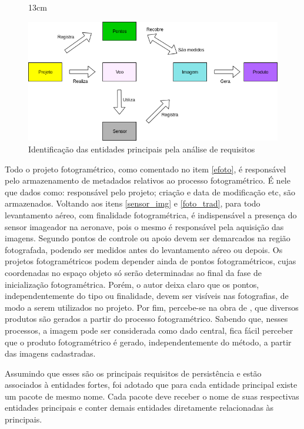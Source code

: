 \begin{figure}[!ht]{13cm}
  \caption{Identificação das entidades principais pela análise de requisitos} \label{requisitos}
  \centering
  \includegraphics[width=1.0\hsize]{figuras/diagrama_requisitos.png}
\end{figure}

Todo o projeto fotogramétrico, como comentado no item \ref{efoto}, é responsável pelo armazenamento de metadados relativos ao processo fotogramétrico. É nele que dados como: responsável pelo projeto; criação e data de modificação etc, são armazenados. 
Voltando aos itens \ref{sensor_img} e \ref{foto_trad}, para todo levantamento aéreo, com finalidade fotogramétrica, é indispensável a presença do sensor imageador na aeronave, pois o mesmo é responsável pela aquisição das imagens.
Segundo  pontos de controle ou apoio devem ser demarcados na região fotografada, podendo ser medidos antes do levantamento aéreo ou depois. Os projetos fotogramétricos podem depender ainda de pontos fotogramétricos, cujas coordenadas no espaço objeto só serão determinadas ao final da fase de inicialização fotogramétrica. Porém, o autor deixa claro que os pontos, independentemente do tipo ou finalidade, devem ser visíveis nas fotografias, de modo a serem utilizados no projeto.
Por fim, percebe-se na obra de , que diversos produtos são gerados a partir do processo fotogramétrico. Sabendo que, nesses processos, a imagem pode ser considerada como dado central, fica fácil perceber que o produto fotogramétrico é gerado, independentemente do método, a partir das imagens cadastradas.

Assumindo que esses são os principais requisitos de persistência e estão associados à entidades fortes, foi adotado que para cada entidade principal existe um pacote de mesmo nome. Cada pacote deve receber o nome de suas respectivas entidades principais e conter demais entidades diretamente relacionadas às principais.

